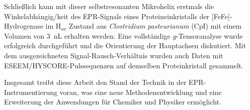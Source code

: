 Schließlich kann mit dieser selbstresonanten Mikrohelix erstmals die Winkelabhängig\-/keit des EPR-Signals eines Proteineinkristalls der [FeFe]-Hydrogenase im H$_{ox}$ Zustand aus \textit{Clostridium pasteurianum} (CpI) mit einem Volumen von 3~nL erhalten werden. 
Eine vollständige $g$-Tensoranalyse wurde erfolgreich durchgeführt und die Orientierung der Hauptachsen diskutiert. Mit dem ausgezeichneten Signal-Rausch-Verhältnis wurden auch Daten mit ESEEM/HYSCORE-Pulssequenzen auf demselben Proteinkristall gesammelt.

Insgesamt treibt diese Arbeit den Stand der Technik in der EPR-Instrumentierung voran, was eine neue Methodenentwicklung und eine Erweiterung der Anwendungen für Chemiker und Physiker ermöglicht.

